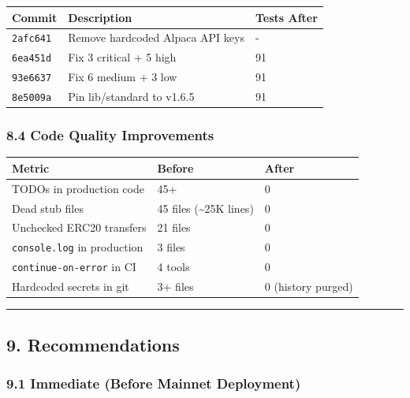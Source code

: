 \documentclass[
]{article}
\newcounter{none} %
\begin{document}
{\def\LTcaptype{none} %
\begin{longtable}[]{@{}lll@{}}
\toprule\noalign{}
Commit & Description & Tests After \\
\midrule\noalign{}
\endhead
\bottomrule\noalign{}
\endlastfoot
\texttt{2afc641} & Remove hardcoded Alpaca API keys & - \\
\texttt{6ea451d} & Fix 3 critical + 5 high & 91 \\
\texttt{93e6637} & Fix 6 medium + 3 low & 91 \\
\texttt{8e5009a} & Pin lib/standard to v1.6.5 & 91 \\
\end{longtable}
}

\subsubsection{8.4 Code Quality
Improvements}\label{84-code-quality-improvements}

{\def\LTcaptype{none} %
\begin{longtable}[]{@{}lll@{}}
\toprule\noalign{}
Metric & Before & After \\
\midrule\noalign{}
\endhead
\bottomrule\noalign{}
\endlastfoot
TODOs in production code & 45+ & 0 \\
Dead stub files & 45 files (\textasciitilde25K lines) & 0 \\
Unchecked ERC20 transfers & 21 files & 0 \\
\texttt{console.log} in production & 3 files & 0 \\
\texttt{continue-on-error} in CI & 4 tools & 0 \\
Hardcoded secrets in git & 3+ files & 0 (history purged) \\
\end{longtable}
}

\begin{center}\rule{0.5\linewidth}{0.5pt}\end{center}

\subsection{9. Recommendations}\label{9-recommendations}

\subsubsection{9.1 Immediate (Before Mainnet
Deployment)}\label{91-immediate-before-mainnet-deployment}
\end{document}
